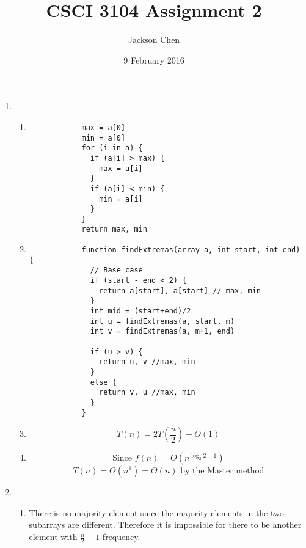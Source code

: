 \documentclass[11pt, letterpaper]{article}
\newcommand{\subtitle}[1]{
  \posttitle{
    \par\end{center}
    \begin{center}\large#1\end{center}
    \vskip0.5em}
}
\begin{document}
  \title{CSCI 3104 Assignment 2}
    \subtitle{10:00 - 10:50 Wanshan}
    \date{9 February 2016}
    \author{Jackson Chen}
    \maketitle

  \begin{enumerate}
    \item
      \begin{enumerate}
        \item
          \begin{lstlisting}
            max = a[0]
            min = a[0]
            for (i in a) {
              if (a[i] > max) {
                max = a[i]
              }
              if (a[i] < min) {
                min = a[i]
              }
            }
            return max, min
          \end{lstlisting}

        \item
          \begin{lstlisting}
            function findExtremas(array a, int start, int end) {
              // Base case
              if (start - end < 2) {
                return a[start], a[start] // max, min
              }
              int mid = (start+end)/2
              int u = findExtremas(a, start, m)
              int v = findExtremas(a, m+1, end)

              if (u > v) {
                return u, v //max, min
              }
              else {
                return v, u //max, min
              }
            }
          \end{lstlisting}

        \item
          \[ T(n) =  2T(\frac{n}{2}) + O(1) \]

        \item
          \[ \text{Since } f(n) = O(n^{\log _2 2 - 1}) \]
          \[ T(n) = \Theta (n^{1}) = \boxed{\Theta (n)} \text{ by the Master method}\]
      \end{enumerate}

    \item
      \begin{enumerate}
        \item
          There is no majority element since the majority elements in the two subarrays are different. Therefore
          it is impossible for there to be another element with $\frac{n}{2}+1$ frequency.


\end{enumerate}
\end{enumerate}
\end{document}
